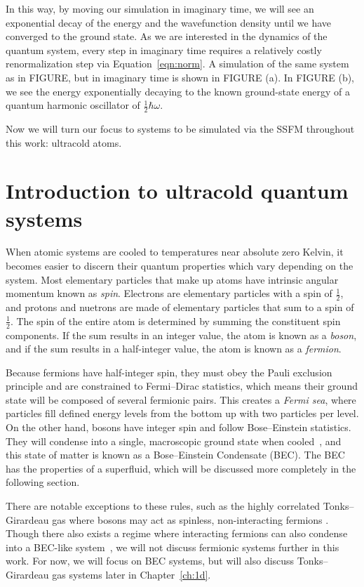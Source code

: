 \noindent In this way, by moving our simulation in imaginary time, we will see an exponential decay of the energy and the wavefunction density until we have converged to the ground state.
As we are interested in the dynamics of the quantum system, every step in imaginary time requires a relatively costly renormalization step via Equation~\ref{eqn:norm}.
A simulation of the same system as in FIGURE, but in imaginary time is shown in FIGURE (a).
In FIGURE (b), we see the energy exponentially decaying to the known ground-state energy of a quantum harmonic oscillator of $\frac{1}{2}\hbar\omega$.

Now we will turn our focus to systems to be simulated via the SSFM throughout this work: ultracold atoms.

\section{Introduction to ultracold quantum systems}
\label{sec:intro}

When atomic systems are cooled to temperatures near absolute zero Kelvin, it becomes easier to discern their quantum properties which vary depending on the system.
Most elementary particles that make up atoms have intrinsic angular momentum known as \textit{spin}.
Electrons are elementary particles with a spin of $\frac{1}{2}$, and protons and nuetrons are made of elementary particles that sum to a spin of $\frac{1}{2}$.
The spin of the entire atom is determined by summing the constituent spin components.
If the sum results in an integer value, the atom is known as a \textit{boson}, and if the sum results in a half-integer value, the atom is known as a \textit{fermion}.

Because fermions have half-integer spin, they must obey the Pauli exclusion principle and are constrained to Fermi--Dirac statistics, which means their ground state will be composed of several fermionic pairs.
This creates a \textit{Fermi sea}, where particles fill defined energy levels from the bottom up with two particles per level.
On the other hand, bosons have integer spin and follow Bose--Einstein statistics.
They will condense into a single, macroscopic ground state when cooled~\cite{Einstein1925, Fetter2003}, and
this state of matter is known as a Bose--Einstein Condensate (BEC).
The BEC has the properties of a superfluid, which will be discussed more completely in the following section.

There are notable exceptions to these rules, such as the highly correlated Tonks--Girardeau gas where bosons may act as spinless, non-interacting fermions \cite{Girardeau}.
Though there also exists a regime where interacting fermions can also condense into a BEC-like system~\cite{Nozieres1985, Bulgac2014}, we will not discuss fermionic systems further in this work.
For now, we will focus on BEC systems, but will also discuss Tonks--Girardeau gas systems later in Chapter~\ref{ch:1d}.


